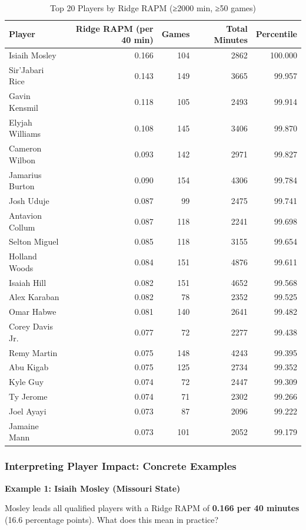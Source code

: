 \documentclass[
  letterpaper,
  DIV=11,
  numbers=noendperiod]{scrartcl}
\begin{document}
\begin{longtable}[t]{lrrrr}
\caption{\label{tab:top-20-players}Top 20 Players by Ridge RAPM (≥2000 min, ≥50 games)}\\
\toprule
Player & Ridge RAPM (per 40 min) & Games & Total Minutes & Percentile\\
\midrule
Isiaih Mosley & 0.166 & 104 & 2862 & 100.000\\
Sir'Jabari Rice & 0.143 & 149 & 3665 & 99.957\\
Gavin Kensmil & 0.118 & 105 & 2493 & 99.914\\
Elyjah Williams & 0.108 & 145 & 3406 & 99.870\\
Cameron Wilbon & 0.093 & 142 & 2971 & 99.827\\
\addlinespace
Jamarius Burton & 0.090 & 154 & 4306 & 99.784\\
Josh Uduje & 0.087 & 99 & 2475 & 99.741\\
Antavion Collum & 0.087 & 118 & 2241 & 99.698\\
Selton Miguel & 0.085 & 118 & 3155 & 99.654\\
Holland Woods & 0.084 & 151 & 4876 & 99.611\\
\addlinespace
Isaiah Hill & 0.082 & 151 & 4652 & 99.568\\
Alex Karaban & 0.082 & 78 & 2352 & 99.525\\
Omar Habwe & 0.081 & 140 & 2641 & 99.482\\
Corey Davis Jr. & 0.077 & 72 & 2277 & 99.438\\
Remy Martin & 0.075 & 148 & 4243 & 99.395\\
\addlinespace
Abu Kigab & 0.075 & 125 & 2734 & 99.352\\
Kyle Guy & 0.074 & 72 & 2447 & 99.309\\
Ty Jerome & 0.074 & 71 & 2302 & 99.266\\
Joel Ayayi & 0.073 & 87 & 2096 & 99.222\\
Jamaine Mann & 0.073 & 101 & 2052 & 99.179\\
\bottomrule
\end{longtable}

\subsubsection{Interpreting Player Impact: Concrete
Examples}\label{interpreting-player-impact-concrete-examples}

\textbf{Example 1: Isiaih Mosley (Missouri State)}

Mosley leads all qualified players with a Ridge RAPM of \textbf{0.166
per 40 minutes} (16.6 percentage points). What does this mean in
practice?
\end{document}
